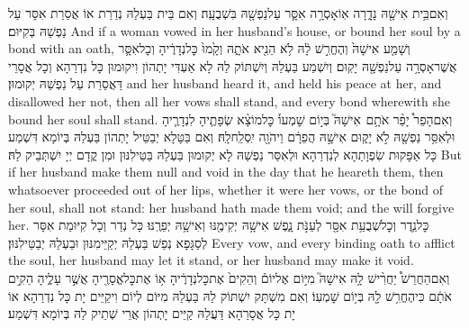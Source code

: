 {וְאִם\maqqaf בֵּ֥ית אִישָׁ֖הּ נָדָ֑רָה אֽוֹ\maqqaf אָסְרָ֥ה אִסָּ֛ר עַל\maqqaf נַפְשָׁ֖הּ בִּשְׁבֻעָֽה׃}
{וְאִם בֵּית בַּעְלַהּ נְדַרַת אוֹ אֲסַרַת אִסָּר עַל נַפְשַׁהּ בְּקִיּוּם׃}
{And if a woman vowed in her husband’s house, or bound her soul by a bond with an oath,}{}
{וְשָׁמַ֤ע אִישָׁהּ֙ וְהֶחֱרִ֣שׁ לָ֔הּ לֹ֥א הֵנִ֖יא אֹתָ֑הּ וְקָ֙מוּ֙ כׇּל\maqqaf נְדָרֶ֔יהָ וְכׇל\maqqaf אִסָּ֛ר אֲשֶׁר\maqqaf אָסְרָ֥ה עַל\maqqaf נַפְשָׁ֖הּ יָקֽוּם׃}
{וְיִשְׁמַע בַּעְלַהּ וְיִשְׁתּוֹק לַהּ לָא אַעְדִּי יָתְהוֹן וִיקוּמוּן כָּל נִדְרַהָא וְכָל אֲסָרֵי דַּאֲסַרַת עַל נַפְשַׁהּ יְקוּמוּן׃}
{and her husband heard it, and held his peace at her, and disallowed her not, then all her vows shall stand, and every bond wherewith she bound her soul shall stand.}{}
{וְאִם\maqqaf הָפֵר֩ יָפֵ֨ר אֹתָ֥ם \pasek  אִישָׁהּ֮ בְּי֣וֹם שׇׁמְעוֹ֒ כׇּל\maqqaf מוֹצָ֨א שְׂפָתֶ֧יהָ לִנְדָרֶ֛יהָ וּלְאִסַּ֥ר נַפְשָׁ֖הּ לֹ֣א יָק֑וּם אִישָׁ֣הּ הֲפֵרָ֔ם וַיהֹוָ֖ה יִֽסְלַֽח\maqqaf לָֽהּ׃}
{וְאִם בַּטָּלָא יְבַטֵּיל יָתְהוֹן בַּעְלַהּ בְּיוֹמָא דִּשְׁמַע כָּל אַפָּקוּת שִׂפְוָתַהָא לְנִדְרַהָא וּלְאִסַּר נַפְשַׁהּ לָא יְקוּמוּן בַּעְלַהּ בַּטֵּילִנּוּן וּמִן קֳדָם יְיָ יִשְׁתְּבֵיק לַהּ׃}
{But if her husband make them null and void in the day that he heareth them, then whatsoever proceeded out of her lips, whether it were her vows, or the bond of her soul, shall not stand: her husband hath made them void; and the \lord\space will forgive her.}{}
{כׇּל\maqqaf נֵ֛דֶר וְכׇל\maqqaf שְׁבֻעַ֥ת אִסָּ֖ר לְעַנֹּ֣ת נָ֑פֶשׁ אִישָׁ֥הּ יְקִימֶ֖נּוּ וְאִישָׁ֥הּ יְפֵרֶֽנּוּ׃}
{כָּל נְדַר וְכָל קִיּוּמַת אִסָּר לְסַגָּפָא נְפַשׁ בַּעְלַהּ יְקַיֵּימִנּוּן וּבַעְלַהּ יְבַטֵּילִנּוּן׃}
{Every vow, and every binding oath to afflict the soul, her husband may let it stand, or her husband may make it void.}{}
{וְאִם\maqqaf הַחֲרֵשׁ֩ יַחֲרִ֨ישׁ לָ֥הּ אִישָׁהּ֮ מִיּ֣וֹם אֶל\maqqaf יוֹם֒ וְהֵקִים֙ אֶת\maqqaf כׇּל\maqqaf נְדָרֶ֔יהָ א֥וֹ אֶת\maqqaf כׇּל\maqqaf אֱסָרֶ֖יהָ אֲשֶׁ֣ר עָלֶ֑יהָ הֵקִ֣ים אֹתָ֔ם כִּי\maqqaf הֶחֱרִ֥שׁ לָ֖הּ בְּי֥וֹם שׇׁמְעֽוֹ׃}
{וְאִם מִשְׁתָּק יִשְׁתּוֹק לַהּ בַּעְלַהּ מִיּוֹם לְיוֹם וִיקַיֵּים יָת כָּל נִדְרַהָא אוֹ יָת כָּל אֲסָרַהָא דַּעֲלַהּ קַיֵּים יָתְהוֹן אֲרֵי שְׁתֵיק לַהּ בְּיוֹמָא דִּשְׁמַע׃}
